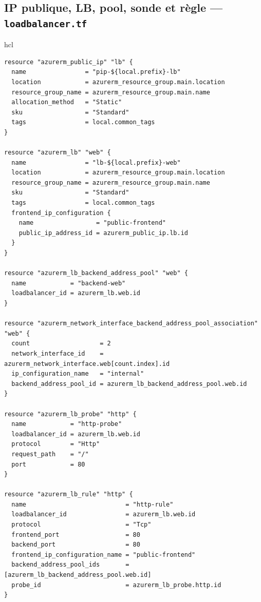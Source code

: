 \documentclass[11pt,a4paper]{article}
\newcommand{\code}[1]{\texttt{#1}}
\begin{document}
\subsection{IP publique, LB, pool, sonde et règle — \code{loadbalancer.tf}}
\begin{codebox}{hcl}
\begin{Verbatim}
resource "azurerm_public_ip" "lb" {
  name                = "pip-${local.prefix}-lb"
  location            = azurerm_resource_group.main.location
  resource_group_name = azurerm_resource_group.main.name
  allocation_method   = "Static"
  sku                 = "Standard"
  tags                = local.common_tags
}

resource "azurerm_lb" "web" {
  name                = "lb-${local.prefix}-web"
  location            = azurerm_resource_group.main.location
  resource_group_name = azurerm_resource_group.main.name
  sku                 = "Standard"
  tags                = local.common_tags
  frontend_ip_configuration {
    name                 = "public-frontend"
    public_ip_address_id = azurerm_public_ip.lb.id
  }
}

resource "azurerm_lb_backend_address_pool" "web" {
  name            = "backend-web"
  loadbalancer_id = azurerm_lb.web.id
}

resource "azurerm_network_interface_backend_address_pool_association" "web" {
  count                   = 2
  network_interface_id    = azurerm_network_interface.web[count.index].id
  ip_configuration_name   = "internal"
  backend_address_pool_id = azurerm_lb_backend_address_pool.web.id
}

resource "azurerm_lb_probe" "http" {
  name            = "http-probe"
  loadbalancer_id = azurerm_lb.web.id
  protocol        = "Http"
  request_path    = "/"
  port            = 80
}

resource "azurerm_lb_rule" "http" {
  name                           = "http-rule"
  loadbalancer_id                = azurerm_lb.web.id
  protocol                       = "Tcp"
  frontend_port                  = 80
  backend_port                   = 80
  frontend_ip_configuration_name = "public-frontend"
  backend_address_pool_ids       = [azurerm_lb_backend_address_pool.web.id]
  probe_id                       = azurerm_lb_probe.http.id
}
\end{Verbatim}
\end{codebox}
\end{document}
